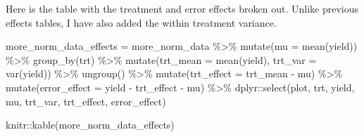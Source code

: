 \documentclass[
]{book}
\newenvironment{Shaded}{\begin{snugshade}}{\end{snugshade}}
\newcommand{\AttributeTok}[1]{\textcolor[rgb]{0.77,0.63,0.00}{#1}}
\newcommand{\FunctionTok}[1]{\textcolor[rgb]{0.00,0.00,0.00}{#1}}
\newcommand{\NormalTok}[1]{#1}
\newcommand{\OtherTok}[1]{\textcolor[rgb]{0.56,0.35,0.01}{#1}}
\newcommand{\SpecialCharTok}[1]{\textcolor[rgb]{0.00,0.00,0.00}{#1}}
\begin{document}
Here is the table with the treatment and error effects broken out. Unlike previous effects tables, I have also added the within treatment variance.

\begin{Shaded}
\begin{Highlighting}[]
\NormalTok{more\_norm\_data\_effects }\OtherTok{=}\NormalTok{ more\_norm\_data }\SpecialCharTok{\%\textgreater{}\%}
  \FunctionTok{mutate}\NormalTok{(}\AttributeTok{mu =} \FunctionTok{mean}\NormalTok{(yield)) }\SpecialCharTok{\%\textgreater{}\%}
  \FunctionTok{group\_by}\NormalTok{(trt) }\SpecialCharTok{\%\textgreater{}\%}
  \FunctionTok{mutate}\NormalTok{(}\AttributeTok{trt\_mean =} \FunctionTok{mean}\NormalTok{(yield),}
         \AttributeTok{trt\_var =} \FunctionTok{var}\NormalTok{(yield)) }\SpecialCharTok{\%\textgreater{}\%}
  \FunctionTok{ungroup}\NormalTok{() }\SpecialCharTok{\%\textgreater{}\%}
  \FunctionTok{mutate}\NormalTok{(}\AttributeTok{trt\_effect =}\NormalTok{ trt\_mean }\SpecialCharTok{{-}}\NormalTok{ mu) }\SpecialCharTok{\%\textgreater{}\%}
  \FunctionTok{mutate}\NormalTok{(}\AttributeTok{error\_effect =}\NormalTok{ yield }\SpecialCharTok{{-}}\NormalTok{ trt\_effect }\SpecialCharTok{{-}}\NormalTok{ mu) }\SpecialCharTok{\%\textgreater{}\%}
\NormalTok{  dplyr}\SpecialCharTok{::}\FunctionTok{select}\NormalTok{(plot, trt, yield, mu, trt\_var, trt\_effect, error\_effect)}

\NormalTok{knitr}\SpecialCharTok{::}\FunctionTok{kable}\NormalTok{(more\_norm\_data\_effects)}
\end{Highlighting}
\end{Shaded}
\end{document}
